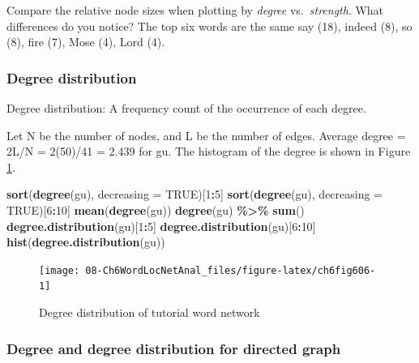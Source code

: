 \documentclass[
]{article}
\newenvironment{Shaded}{\begin{snugshade}}{\end{snugshade}}
\newcommand{\AttributeTok}[1]{\textcolor[rgb]{0.13,0.29,0.53}{#1}}
\newcommand{\ConstantTok}[1]{\textcolor[rgb]{0.56,0.35,0.01}{#1}}
\newcommand{\DecValTok}[1]{\textcolor[rgb]{0.00,0.00,0.81}{#1}}
\newcommand{\FunctionTok}[1]{\textcolor[rgb]{0.13,0.29,0.53}{\textbf{#1}}}
\newcommand{\NormalTok}[1]{#1}
\newcommand{\SpecialCharTok}[1]{\textcolor[rgb]{0.81,0.36,0.00}{\textbf{#1}}}
\begin{document}
Compare the relative node sizes when plotting by \emph{degree} vs.~\emph{strength}. What differences do you notice? The top six words are the same say (18), indeed (8), so (8), fire (7), Mose (4), Lord (4).

\hypertarget{degree-distribution}{%
\subsubsection{Degree distribution}\label{degree-distribution}}

Degree distribution: A frequency count of the occurrence of each degree.

Let N be the number of nodes, and L be the number of edges. Average degree = 2L/N = 2(50)/41 = 2.439 for gu. The histogram of the degree is shown in Figure \ref{fig:ch6fig606}.

\begin{Shaded}
\begin{Highlighting}[]
\FunctionTok{sort}\NormalTok{(}\FunctionTok{degree}\NormalTok{(gu), }\AttributeTok{decreasing =} \ConstantTok{TRUE}\NormalTok{)[}\DecValTok{1}\SpecialCharTok{:}\DecValTok{5}\NormalTok{]}
\FunctionTok{sort}\NormalTok{(}\FunctionTok{degree}\NormalTok{(gu), }\AttributeTok{decreasing =} \ConstantTok{TRUE}\NormalTok{)[}\DecValTok{6}\SpecialCharTok{:}\DecValTok{10}\NormalTok{]}
\FunctionTok{mean}\NormalTok{(}\FunctionTok{degree}\NormalTok{(gu))}
\FunctionTok{degree}\NormalTok{(gu) }\SpecialCharTok{\%\textgreater{}\%} \FunctionTok{sum}\NormalTok{()}
\FunctionTok{degree.distribution}\NormalTok{(gu)[}\DecValTok{1}\SpecialCharTok{:}\DecValTok{5}\NormalTok{]}
\FunctionTok{degree.distribution}\NormalTok{(gu)[}\DecValTok{6}\SpecialCharTok{:}\DecValTok{10}\NormalTok{]}
\FunctionTok{hist}\NormalTok{(}\FunctionTok{degree.distribution}\NormalTok{(gu))}
\end{Highlighting}
\end{Shaded}

\begin{figure}

{\centering \texttt{[image: 08-Ch6WordLocNetAnal\_files/figure-latex/ch6fig606-1]} 

}

\caption{Degree distribution of tutorial word network}\label{fig:ch6fig606}
\end{figure}

\hypertarget{degree-and-degree-distribution-for-directed-graph}{%
\subsubsection{Degree and degree distribution for directed graph}\label{degree-and-degree-distribution-for-directed-graph}}
\end{document}
